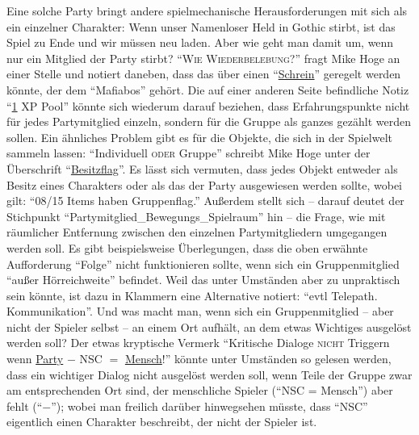 \documentclass[a5paper,pagesize,numbers=noenddot]{scrbook}
\begin{document}
Eine solche Party bringt andere spielmechanische Herausforderungen mit sich als ein einzelner Charakter:
Wenn unser Namenloser Held in Gothic stirbt, ist das Spiel zu Ende und wir müssen neu laden.
Aber wie geht man damit um, wenn nur ein Mitglied der Party stirbt?
\enquote{\textsc{Wie Wiederbelebung?}} fragt Mike Hoge an einer Stelle und notiert daneben, dass das über einen \enquote{\uline{Schrein}} geregelt werden könnte, der dem \enquote{Mafiabos} gehört.\autocite[S.~7]{orpheus_b_scribbles}
Die auf einer anderen Seite befindliche Notiz \enquote{\uline{1} XP Pool}\autocite[S.~8]{orpheus_b_scribbles} könnte sich wiederum darauf beziehen, dass Erfahrungspunkte nicht für jedes Partymitglied einzeln, sondern für die Gruppe als ganzes gezählt werden sollen.
Ein ähnliches Problem gibt es für die Objekte, die sich in der Spielwelt sammeln lassen:
\enquote{Individuell \textsc{oder} Gruppe} schreibt Mike Hoge unter der Überschrift \enquote{\uline{Besitzflag}}.
Es lässt sich vermuten, dass jedes Objekt entweder als Besitz eines Charakters oder als das der Party ausgewiesen werden sollte, wobei gilt:
\enquote{08/15 Items haben Gruppenflag.}\autocite[S.~9]{orpheus_b_scribbles}
Außerdem stellt sich -- darauf deutet der Stichpunkt \enquote{Partymitglied\_Bewegungs\_Spielraum}\autocite[S.~8]{orpheus_b_scribbles} hin -- die Frage, wie mit räumlicher Entfernung zwischen den einzelnen Partymitgliedern umgegangen werden soll.
Es gibt beispielsweise Überlegungen, dass die oben erwähnte Aufforderung \enquote{Folge} nicht funktionieren sollte, wenn sich ein Gruppenmitglied \enquote{außer Hörreichweite} befindet.
Weil das unter Umständen aber zu unpraktisch sein könnte, ist dazu in Klammern eine Alternative notiert:
\enquote{evtl Telepath. Kommunikation}.\autocite[S.~5]{orpheus_interface}
Und was macht man, wenn sich ein Gruppenmitglied -- aber nicht der Spieler selbst -- an einem Ort aufhält, an dem etwas Wichtiges ausgelöst werden soll?
Der etwas kryptische Vermerk \enquote{Kritische Dialoge \textsc{nicht} Triggern wenn \uline{Party} $-$ NSC $=$ \uline{Mensch}!}\autocite[S.~9]{orpheus_b_scribbles} könnte unter Umständen so gelesen werden, dass ein wichtiger Dialog nicht ausgelöst werden soll, wenn Teile der Gruppe zwar am entsprechenden Ort sind, der menschliche Spieler (\enquote{NSC = Mensch}) aber fehlt (\enquote{$-$}); wobei man freilich darüber hinwegsehen müsste, dass \enquote{NSC} eigentlich einen Charakter beschreibt, der nicht der Spieler ist.
\end{document}
